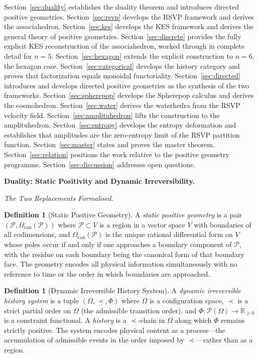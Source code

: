 \documentclass[11pt]{article}
\theoremstyle{plain}
\theoremstyle{definition}
\newtheorem{definition}[theorem]{Definition}
\theoremstyle{remark}
\newcommand{\R}{\mathbb{R}}
\newcommand{\Phif}{\Phi}
\newcommand{\OmKS}{\Omega}
\newcommand{\CF}{\Omega_{\mathrm{can}}}
\begin{document}
Section~\ref{sec:duality} establishes the duality theorem and introduces directed positive geometries. Section~\ref{sec:rsvp} develops the RSVP framework and derives the associahedron. Section~\ref{sec:kes} develops the KES framework and derives the general theory of positive geometries. Section~\ref{sec:discrete} provides the fully explicit KES reconstruction of the associahedron, worked through in complete detail for $n=5$. Section~\ref{sec:hexagon} extends the explicit construction to $n=6$, the hexagon case. Section~\ref{sec:categorical} develops the history category and proves that factorization equals monoidal functoriality. Section~\ref{sec:directed} introduces and develops directed positive geometries as the synthesis of the two frameworks. Section~\ref{sec:spherepop} develops the Spherepop calculus and derives the cosmohedron. Section~\ref{sec:water} derives the waterhedra from the RSVP velocity field. Section~\ref{sec:amplituhedron} lifts the construction to the amplituhedron. Section~\ref{sec:entropy} develops the entropy deformation and establishes that amplitudes are the zero-entropy limit of the RSVP partition function. Section~\ref{sec:master} states and proves the master theorem. Section~\ref{sec:relation} positions the work relative to the positive geometry programme. Section~\ref{sec:discussion} addresses open questions.

\bigskip\noindent\textbf{Duality: Static Positivity and Dynamic Irreversibility.}
\label{sec:duality}

\medskip\noindent\textit{The Two Replacements Formalised.}

\begin{definition}[Static Positive Geometry]
A \emph{static positive geometry} is a pair $(\mathcal{P}, \CF(\mathcal{P}))$ where $\mathcal{P} \subset V$ is a region in a vector space $V$ with boundaries of all codimensions, and $\CF(\mathcal{P})$ is the unique rational differential form on $V$ whose poles occur if and only if one approaches a boundary component of $\mathcal{P}$, with the residue on each boundary being the canonical form of that boundary face. The geometry encodes all physical information simultaneously with no reference to time or the order in which boundaries are approached.
\end{definition}

\begin{definition}[Dynamic Irreversible History System]
A \emph{dynamic irreversible history system} is a tuple $(\OmKS, \prec, \Phif)$ where $\OmKS$ is a configuration space, $\prec$ is a strict partial order on $\OmKS$ (the admissible transition order), and $\Phif: \mathcal{P}(\OmKS) \to \R_{\geq 0}$ is a constraint functional. A \emph{history} is a $\prec$-chain in $\OmKS$ along which $\Phif$ remains strictly positive. The system encodes physical content as a process---the accumulation of admissible events in the order imposed by $\prec$---rather than as a region.
\end{definition}
\end{document}
